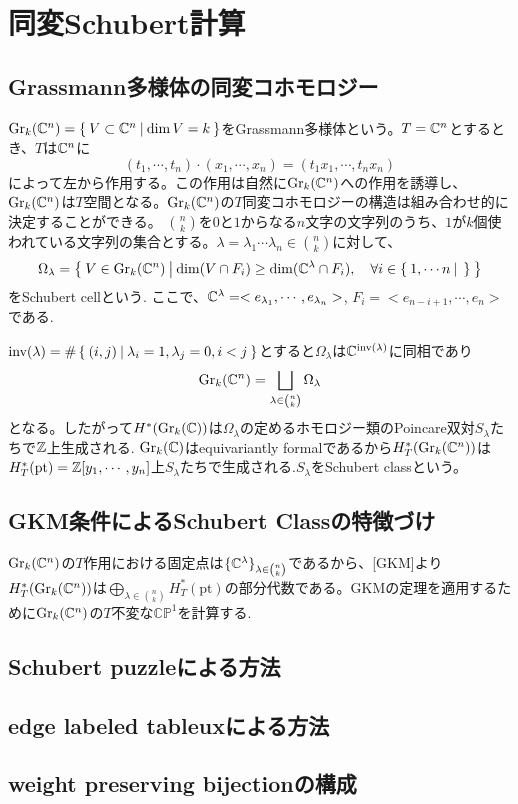 \section{同変Schubert計算}
\subsection{Grassmann多様体の同変コホモロジー}
$\text{Gr}_k(\mathbb{C}^n)=\left\{\:V\subset \mathbb{C}^n\:\middle|\:\dim V = k\:\right\}$をGrassmann多様体という。$T=\mathbb{C}^n$とするとき、$T$は$\mathbb{C}^n$に
\[
(t_1,\cdots,t_n)\cdot(x_1,\cdots,x_n)=(t_1x_1,\cdots,t_nx_n)
\]
によって左から作用する。この作用は自然に$\text{Gr}_k(\mathbb{C}^n)$への作用を誘導し、$\text{Gr}_k(\mathbb{C}^n)$は$T$空間となる。$\text{Gr}_k(\mathbb{C}^n)$の$T$同変コホモロジーの構造は組み合わせ的に決定することができる。
$\binom{n}{k}$を$0$と$1$からなる$n$文字の文字列のうち、$1$が$k$個使われている文字列の集合とする。$\lambda=\lambda_1\cdots \lambda_n\in\binom{n}{k}$に対して、
\[
\Omega_\lambda=\left\{\:V\in \text{Gr}_k(\mathbb{C}^n)\:\middle|\:\dim(V\cap F_i)\geq \dim(\mathbb{C}^\lambda\cap F_i),\quad \forall i\in \left\{\:1,\cdots n\:\middle|\:\:\right\}\:\right\}
\]
をSchubert cellという. ここで、$\mathbb{C}^\lambda=<e_{\lambda_1},\cdots,e_{\lambda_n}>$, $F_i=<e_{n-i+1},\cdots,e_n>$である. 

$\text{inv}(\lambda)=\#\left\{\:(i,j)\:\middle|\:\lambda_i=1, \lambda_j=0, i<j\:\right\}$とすると$\Omega_\lambda$は$\mathbb{C}^{\text{inv}(\lambda)}$に同相であり
\[
\text{Gr}_k(\mathbb{C}^n)=\bigsqcup_{\lambda\in\binom{n}{k}}\Omega_\lambda
\]
となる。したがって$H^*(\text{Gr}_k(\mathbb{C}))$は$\Omega_\lambda$の定めるホモロジー類のPoincare双対$S_\lambda$たちで$\mathbb{Z}$上生成される. $\text{Gr}_k(\mathbb{C})$はequivariantly formalであるから$H^*_T(\text{Gr}_k(\mathbb{C}^n))$は$H^*_T(\text{pt})=\mathbb{Z}[y_1,\cdots,y_n]$上$S_\lambda$たちで生成される.$S_\lambda$をSchubert classという。


\subsection{GKM条件によるSchubert Classの特徴づけ}

$\text{Gr}_k(\mathbb{C}^n)$の$T$作用における固定点は$\{\mathbb{C}^\lambda\}_{\lambda\in\binom{n}{k}}$であるから、[GKM]より$H^*_T(\text{Gr}_k(\mathbb{C}^n))$は$\bigoplus_{\lambda\in\binom{n}{k}}H^*_T(\text{pt})$の部分代数である。GKMの定理を適用するために$\text{Gr}_k(\mathbb{C}^n)$の$T$不変な$\mathbb{CP}^1$を計算する.



\subsection{Schubert puzzleによる方法}

\subsection{edge labeled tableuxによる方法}

\subsection{weight preserving bijectionの構成}